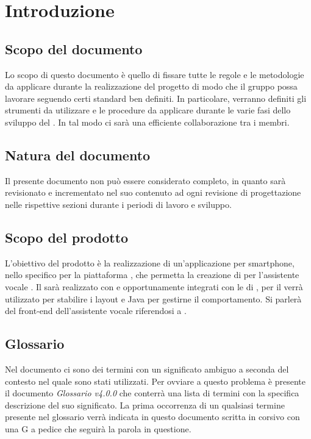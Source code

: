 \section{Introduzione}
\label{sec:intro}
\subsection{Scopo del documento}
Lo scopo di questo documento è quello di fissare tutte le regole e le metodologie da applicare durante la realizzazione del progetto di modo che il gruppo possa lavorare seguendo certi standard ben definiti. In particolare, verranno definiti gli strumenti da utilizzare e le procedure da applicare durante le varie fasi dello sviluppo del . In tal modo ci sarà una efficiente collaborazione tra i membri.
\subsection{Natura del documento}
Il presente documento non può essere considerato completo, in quanto sarà revisionato e incrementato nel suo contenuto ad ogni revisione di progettazione nelle rispettive sezioni durante i periodi di lavoro e sviluppo.
\subsection{Scopo del prodotto}
L'obiettivo del prodotto è la realizzazione di un'applicazione per smartphone, nello specifico per la piattaforma , che permetta la creazione di  per l'assistente vocale  . Il  sarà realizzato con  e  opportunamente integrati con le  di , per il  verrà utilizzato  per stabilire i layout e Java per gestirne il comportamento. Si parlerà del front-end dell'assistente vocale riferendosi a .
\subsection{Glossario}
\label{sec:glossario}
Nel documento ci sono dei termini con un significato ambiguo a seconda del contesto nel quale sono stati utilizzati. Per ovviare a questo problema è presente il documento \emph{Glossario v4.0.0} che conterrà una lista di termini con la specifica descrizione del suo significato. La prima occorrenza di un qualsiasi termine presente nel glossario verrà indicata in questo documento scritta in corsivo con una G a pedice che seguirà la parola in questione.
